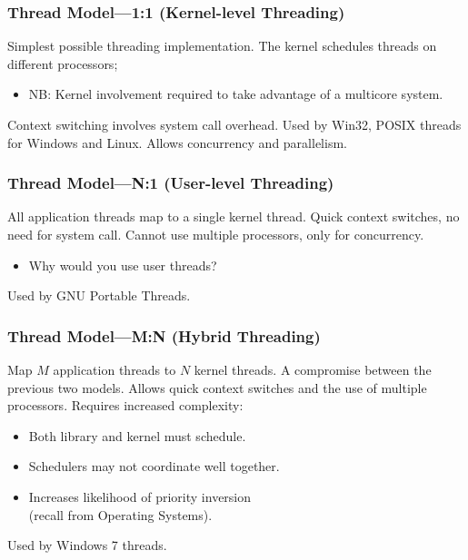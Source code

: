 \begin{frame}
  \frametitle{Thread Model---1:1 (Kernel-level Threading)}


    Simplest possible threading implementation.
    \vfill
    The kernel schedules threads on different processors;
      \begin{itemize}
        \item NB: Kernel involvement required to take advantage of a multicore system.
      \end{itemize}
    \vfill
    Context switching involves system call overhead.
    \vfill
    Used by Win32, POSIX threads for Windows and Linux.
    \vfill
    Allows concurrency and parallelism.

\end{frame}

\begin{frame}
  \frametitle{Thread Model---N:1 (User-level Threading)}

    All application threads map to a single kernel thread.
    \vfill
    Quick context switches, no need for system call.
    \vfill
    Cannot use multiple processors, only for concurrency.
      \begin{itemize}
        \item Why would you use user threads?
      \end{itemize}
    \vfill
    Used by GNU Portable Threads.
\end{frame}

\begin{frame}
  \frametitle{Thread Model---M:N (Hybrid Threading)}

    Map $M$ application threads to $N$ kernel threads.
    \vfill
    A compromise between the previous two models.
    \vfill
    Allows quick context switches and the use of multiple processors.
    \vfill
    Requires increased complexity:
    \begin{itemize}
        \item Both library and kernel must schedule.
        \item Schedulers may not coordinate well together.
        \item Increases likelihood of priority inversion\\ \hspace*{2em} (recall from Operating Systems).
      \end{itemize}
    \vfill
    Used by Windows 7 threads.
\end{frame}

